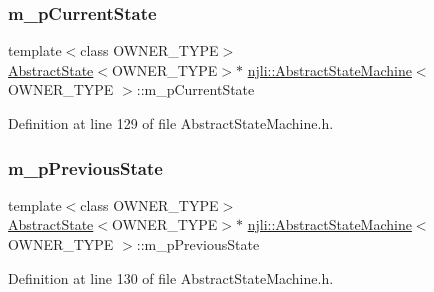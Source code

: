 \subsubsection{\texorpdfstring{m\+\_\+p\+Current\+State}{m\_pCurrentState}}
{\footnotesize\ttfamily template$<$class O\+W\+N\+E\+R\+\_\+\+T\+Y\+PE$>$ \\
\mbox{\hyperlink{classnjli_1_1_abstract_state}{Abstract\+State}}$<$O\+W\+N\+E\+R\+\_\+\+T\+Y\+PE$>$$\ast$ \mbox{\hyperlink{classnjli_1_1_abstract_state_machine}{njli\+::\+Abstract\+State\+Machine}}$<$ O\+W\+N\+E\+R\+\_\+\+T\+Y\+PE $>$\+::m\+\_\+p\+Current\+State\hspace{0.3cm}{\ttfamily [private]}}



Definition at line 129 of file Abstract\+State\+Machine.\+h.

\mbox{\label{classnjli_1_1_abstract_state_machine_a43a2c2c7a36aba24176e5d6d82ab9f45}} 
\subsubsection{\texorpdfstring{m\+\_\+p\+Previous\+State}{m\_pPreviousState}}
{\footnotesize\ttfamily template$<$class O\+W\+N\+E\+R\+\_\+\+T\+Y\+PE$>$ \\
\mbox{\hyperlink{classnjli_1_1_abstract_state}{Abstract\+State}}$<$O\+W\+N\+E\+R\+\_\+\+T\+Y\+PE$>$$\ast$ \mbox{\hyperlink{classnjli_1_1_abstract_state_machine}{njli\+::\+Abstract\+State\+Machine}}$<$ O\+W\+N\+E\+R\+\_\+\+T\+Y\+PE $>$\+::m\+\_\+p\+Previous\+State\hspace{0.3cm}{\ttfamily [private]}}



Definition at line 130 of file Abstract\+State\+Machine.\+h.

\mbox{\label{classnjli_1_1_abstract_state_machine_afc1c0619e024e807c01802979d5ef3db}} 
